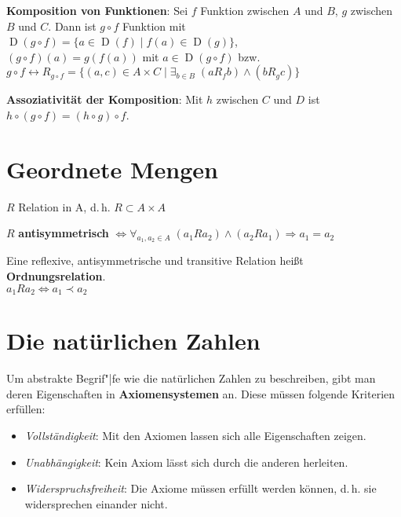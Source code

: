 \linie

\textbf{Komposition von Funktionen}: Sei $f$ Funktion zwischen $A$ und $B$, $g$
zwischen $B$ und $C$. Dann ist $g \circ f$ Funktion mit
$\operatorname{D}(g \circ f) =
\{a \in \operatorname{D}(f) \;|\; f(a) \in \operatorname{D}(g)\}$, \\
$(g \circ f)(a) = g(f(a))$ mit $a \in \operatorname{D}(g \circ f)$ bzw.
$g \circ f \leftrightarrow R_{g \circ f} = \{(a,c) \in A \times C \;|\;
\exists_{b \in B}\; (a R_f b) \land (b R_g c)\}$

\textbf{Assoziativität der Komposition}: Mit $h$ zwischen $C$ und $D$ ist
$h \circ (g \circ f) = (h \circ g) \circ f$.

\section{%
    Geordnete Mengen%
}

$R$ Relation in A, d.\,h. $R \subset A \times A$

$R$ \textbf{antisymmetrisch}
$\Leftrightarrow \forall_{a_1, a_2 \in A}\;
(a_1 R a_2) \land (a_2 R a_1) \Rightarrow a_1 = a_2$

Eine reflexive, antisymmetrische und transitive Relation heißt
\textbf{Ordnungsrelation}. \\
$a_1 R a_2 \Leftrightarrow a_1 \prec a_2$

\section{%
    Die natürlichen Zahlen%
}

Um abstrakte Begrif"|fe wie die natürlichen Zahlen zu beschreiben, gibt man
deren Eigenschaften in \textbf{Axiomensystemen} an.
Diese müssen folgende Kriterien erfüllen:
\begin{itemize}
    \item \emph{Vollständigkeit}: Mit den Axiomen lassen sich alle
    Eigenschaften zeigen.

    \item \emph{Unabhängigkeit}: Kein Axiom lässt sich durch die anderen
    herleiten.

    \item \emph{Widerspruchsfreiheit}: Die Axiome müssen erfüllt werden können,
    d.\,h. sie widersprechen einander nicht.
\end{itemize}

\linie

